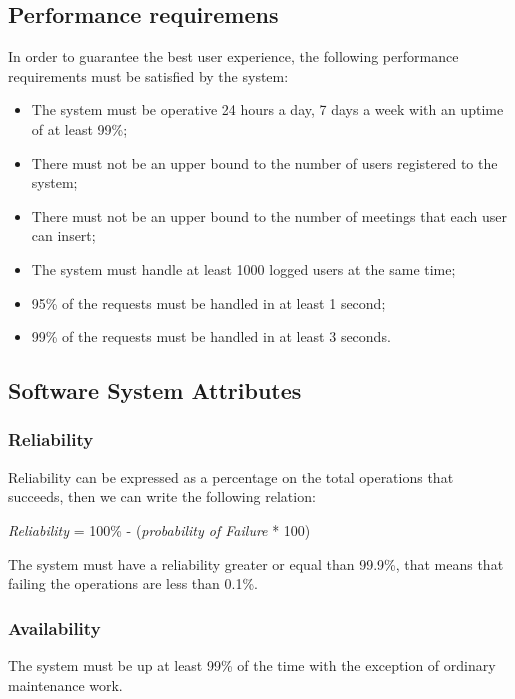 \documentclass{article}
\begin{document}
	
	\subsection{Performance requiremens}
	In order to guarantee the best user experience, the following performance requirements must be satisfied by the system:
	\begin{itemize}
		\item The system must be operative 24 hours a day, 7 days a week with an uptime of at least 99\%;
		\item There must not be an upper bound to the number of users registered to the system;
		\item There must not be an upper bound to the number of meetings that each user can insert; 
		\item The system must handle at least 1000 logged users at the same time;
		\item 95\% of the requests must be handled in at least 1 second; \footnotemark[1]
		\item 99\%  of the requests must be handled in at least 3 seconds. \footnotemark[1]
	\end{itemize}
	
	\bigskip
	\noindent
	
	
	\subsection{Software System Attributes}
	
	
	\subsubsection{Reliability}
	Reliability can be expressed as a percentage on the total operations that succeeds, then we can write the following relation:
	
	\bigskip
	\begin{center}
		\textit{Reliability}  = 100\% - (\textit{probability of Failure} * 100)
	\end{center}

	\bigskip
	The system must have a reliability greater or equal than 99.9\%, that means that failing the operations are less than 0.1\%.

	
	\subsubsection{Availability}
	The system must be up at least 99\% of the time with the exception of ordinary maintenance work.
	
\end{document}
